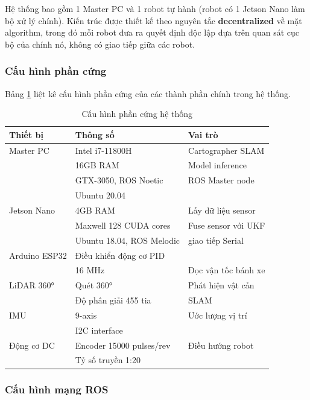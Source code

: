 Hệ thống bao gồm 1 Master PC và 1 robot tự hành (robot có 1 Jetson Nano làm bộ xử lý chính). Kiến trúc được thiết kế theo nguyên tắc \textbf{decentralized} về mặt algorithm, trong đó mỗi robot đưa ra quyết định độc lập dựa trên quan sát cục bộ của chính nó, không có giao tiếp giữa các robot.

\subsubsection{Cấu hình phần cứng}

Bảng \ref{tab:hardware_config} liệt kê cấu hình phần cứng của các thành phần chính trong hệ thống.

\begin{table}[H]
\centering
\caption{Cấu hình phần cứng hệ thống}
\label{tab:hardware_config}
\begin{tabular}{lll}
\hline
\textbf{Thiết bị} & \textbf{Thông số} & \textbf{Vai trò} \\
\hline
Master PC & Intel i7-11800H & Cartographer SLAM \\
          & 16GB RAM & Model inference \\
          & GTX-3050, ROS Noetic & ROS Master node \\
          & Ubuntu 20.04 &  \\
\hline
Jetson Nano & 4GB RAM & Lấy dữ liệu sensor \\
            & Maxwell 128 CUDA cores & Fuse sensor với UKF \\
            & Ubuntu 18.04, ROS Melodic & giao tiếp Serial \\
\hline
Arduino ESP32 & Điều khiển động cơ PID \\
             & 16 MHz & Đọc vận tốc bánh xe \\
\hline
LiDAR 360° & Quét 360° & Phát hiện vật cản \\
                & Độ phân giải 455 tia & SLAM \\
\hline
IMU & 9-axis & Ước lượng vị trí \\
                 & I2C interface &  \\
\hline
Động cơ DC  & Encoder 15000 pulses/rev & Điều hướng robot \\
            & Tỷ số truyền 1:20 &  \\
\hline
\end{tabular}
\end{table}

\subsubsection{Cấu hình mạng ROS}

